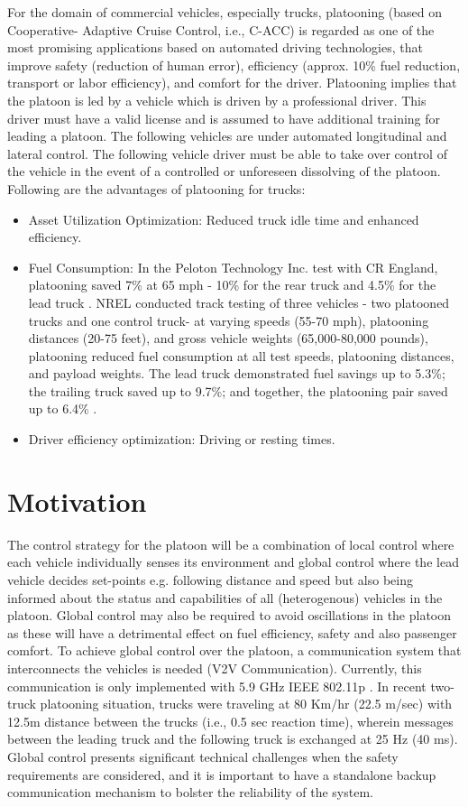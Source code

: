 For the domain of commercial vehicles, especially trucks, platooning (based on Cooperative- Adaptive Cruise Control, i.e., C-ACC) is regarded as one of the most promising applications based on automated driving technologies, that improve safety (reduction of human error), efficiency (approx. 10\% fuel reduction, transport or labor efficiency), and comfort for the driver. Platooning implies that the platoon is led by a vehicle which is driven by a professional driver. This driver must have a valid license and is assumed to have additional training for leading a platoon. The following vehicles are under automated longitudinal and lateral control. The following vehicle driver must be able to take over control of the vehicle in the event of a controlled or unforeseen dissolving of the platoon. Following are the advantages of platooning for trucks:
\begin{itemize}
	\item Asset Utilization Optimization: Reduced truck idle time and enhanced efficiency.
	\item Fuel Consumption: In the Peloton Technology Inc. test with CR England, platooning saved 7\% at 65 mph - 10\% for the rear truck and 4.5\% for the lead truck \cite{fleetOwner}. NREL conducted track testing of three vehicles - two platooned trucks and one control truck- at varying speeds (55-70 mph), platooning distances (20-75 feet), and gross vehicle weights (65,000-80,000 pounds), platooning reduced fuel consumption at all test speeds, platooning distances, and payload weights. The lead truck demonstrated fuel savings up to 5.3\%; the trailing truck saved up to 9.7\%; and together, the platooning pair saved up to 6.4\% \cite{NREL}.
	\item Driver efficiency optimization: Driving or resting times.
	
\end{itemize}
\section{Motivation}
The control strategy for the platoon will be a combination of local control where each vehicle individually senses its environment and global control where the lead vehicle decides set-points e.g. following distance and speed but also being informed about the status and capabilities of all (heterogenous) vehicles in the platoon. Global control may also be required to avoid oscillations in the platoon as these will have a detrimental effect on fuel efficiency, safety and also passenger comfort. To achieve global control over the platoon, a communication system that interconnects the vehicles is needed (V2V Communication). Currently, this communication is only implemented with 5.9 GHz IEEE 802.11p \cite{802.11pStandard}. In recent two-truck platooning \cite{euTPC} situation, trucks were traveling at 80 Km/hr (22.5 m/sec) with 12.5m distance between the trucks (i.e., 0.5 sec reaction time), wherein messages between the leading truck and the following truck is exchanged at 25 Hz (40 ms). Global control presents significant technical challenges when the safety requirements are considered, and it is important to have a standalone backup communication mechanism to bolster the reliability of the system.


